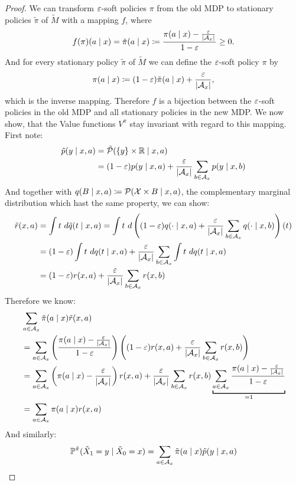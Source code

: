\begin{proof}
	We can transform \(\varepsilon\)-soft policies \(\pi\) from the old MDP to stationary policies \(\tilde{\pi}\) of \(\tilde{M}\) with a mapping \(f\), where
	\[
		f(\pi)(a\mid x)=\tilde{\pi}(a\mid x)\coloneqq \frac{\pi(a\mid x)-\frac{\varepsilon}{|\mathcal{A}_x|}}{1-\varepsilon}\ge 0.
	\]
	And for every stationary policy \(\tilde{\pi}\) of \(\tilde{M}\) we can define the \(\varepsilon\)-soft policy \(\pi\) by
	\[
		\pi(a\mid x)\coloneqq (1-\varepsilon)\tilde{\pi}(a\mid x) + \frac{\varepsilon}{|\mathcal{A}_x|},
	\]
	which is the inverse mapping. Therefore \(f\) is a bijection between the \(\varepsilon\)-soft policies in the old MDP and all stationary policies in the new MDP. We now show, that the Value functions \(V^\pi\) stay invariant with regard to this mapping. 
	First note:
	\begin{align*}
		\tilde{p}(y\mid x,a)
		&=\tilde{\mathcal{P}}(\{y\}\times \mathbb{R}\mid x,a)\\
		&=(1-\varepsilon)p(y\mid x,a)+\frac{\varepsilon}{|\mathcal{A}_x|}\sum_{b\in\mathcal{A}_x}p(y\mid x,b)
	\end{align*}
	And together with \(q(B\mid x,a)\coloneqq \mathcal{P}(\mathcal{X}\times B \mid x,a)\), the complementary marginal distribution which hast the same property, we can show:
	\begin{align*}
		\tilde{r}(x,a)&=\int t\ d\tilde{q}(t \mid x,a)=\int t\ 
		d\left((1-\vep)q(\cdot\mid x,a) + \frac{\vep}{|\cA_x|}\sum_{b\in\cA_x}q(\cdot\mid x,b)\right)(t) \\
		&=(1-\vep)\int t\ dq(t\mid x,a) 
		+ \frac{\vep}{|\cA_x|}\sum_{b\in\cA_x} \int t\ dq(t\mid x,a)\\
		&=(1-\vep)r(x,a) + \frac{\vep}{|\cA_x|}\sum_{b\in\cA_x}r(x,b)
	\end{align*}
	Therefore we know:
	\begin{align*}
		&\sum_{a\in\cA_x}\tilde{\pi}(a\mid x)\tilde{r}(x,a)\\
		&=\sum_{a\in\cA_x} \left(\frac{\pi(a\mid x)-\frac{\vep}{|\cA_x|}}{1-\vep} \right)
		\left((1-\vep)r(x,a) + \frac{\vep}{|\cA_x|}\sum_{b\in\cA_x}r(x,b)\right)\\
		&=\sum_{a\in\cA_x}\left(\pi(a\mid x)-\frac{\vep}{|\cA_x|}\right)r(x,a) 
		+ \frac{\vep}{|\cA_x|}\sum_{b\in\cA_x}r(x,b) 
		\underbracket[1pt]{\sum_{a\in\cA_x}\frac{\pi(a\mid x)-\frac{\vep}{|\cA_x|}}{1-\vep}}_{
			=1
		}\\
		&=\sum_{a\in\cA_x}\pi(a\mid x)r(x,a)
	\end{align*}
	And similarly:
	\begin{align*}
		&\Pr^{\tilde{\pi}}(\tilde{X}_1=y\mid \tilde{X}_0=x) 
		=\sum_{a\in\cA_x}\tilde{\pi}(a\mid x)\tilde{p}(y\mid x,a)\\

\end{align*}
\end{proof}
